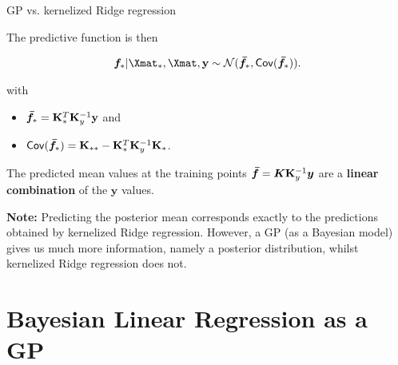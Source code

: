 \begin{vbframe}{GP vs. kernelized Ridge regression} 

The predictive function is then 

\begin{eqnarray*}
\bm{f}_* | \Xmat_*, \Xmat, \ydat \sim \mathcal{N}(\bm{\bar f}_*, \cov(\bm{\bar f}_*)).
\end{eqnarray*}

with 

\begin{itemize}
\item $\bm{\bar f}_* = \mathbf{K}_{*}^{T} \mathbf{K}_y^{-1}\mathbf{y}$ and
\item $\mathsf{Cov}(\bm{\bar f}_*) = \mathbf{K}_{**}- \mathbf{K}_{*}^{T}\mathbf{K}_y^{-1}\mathbf{K}_*$.
\end{itemize}

The predicted mean values at the training points $\bm{\bar f} = \bm{K}\mathbf{K}_y^{-1}\bm{y}$ are a \textbf{linear combination} of the $\bm{y}$ values. 

\lz 

\textbf{Note:} Predicting the posterior mean corresponds exactly to the predictions obtained by kernelized Ridge regression. However, a GP (as a Bayesian model) gives us much more information, namely a posterior distribution, whilst kernelized Ridge regression does not. 


\end{vbframe}




\section{Bayesian Linear Regression as a GP}


